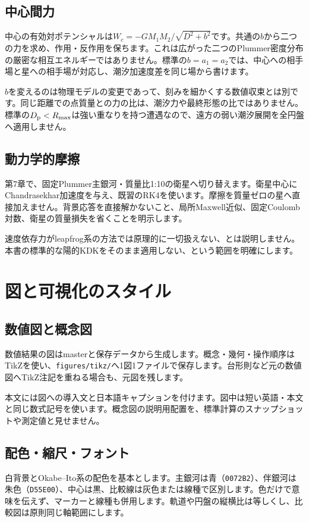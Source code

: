 \documentclass[10pt,openany]{book}
\begin{document}
\subsection{中心間力}
中心の有効対ポテンシャルは$W_c=-GM_1M_2/\sqrt{D^2+b^2}$です。共通の$b$から二つの力を求め、作用・反作用を保ちます。これは広がった二つのPlummer密度分布の厳密な相互エネルギーではありません。標準の$b=a_1=a_2$では、中心への相手場と星への相手場が対応し、潮汐加速度差を同じ場から書けます。

$b$を変えるのは物理モデルの変更であって、刻みを細かくする数値収束とは別です。同じ距離での点質量との力の比は、潮汐力や最終形態の比ではありません。標準の$D_{\rm p}<R_{\max}$は強い重なりを持つ遭遇なので、遠方の弱い潮汐展開を全円盤へ適用しません。
\subsection{動力学的摩擦}
第7章で、固定Plummer主銀河・質量比1:10の衛星へ切り替えます。衛星中心にChandrasekhar加速度を与え、既習のRK4を使います。摩擦を質量ゼロの星へ直接加えません。背景応答を直接解かないこと、局所Maxwell近似、固定Coulomb対数、衛星の質量損失を省くことを明示します。

速度依存力がleapfrog系の方法では原理的に一切扱えない、とは説明しません。本書の標準的な陽的KDKをそのまま適用しない、という範囲を明確にします。


\section{図と可視化のスタイル}
\subsection{数値図と概念図}
数値結果の図はmasterと保存データから生成します。概念・幾何・操作順序はTikZを使い、\texttt{figures/tikz/}へ1図1ファイルで保存します。台形則など元の数値図へTikZ注記を重ねる場合も、元図を残します。

本文には図への導入文と日本語キャプションを付けます。図中は短い英語・本文と同じ数式記号を使います。概念図の説明用配置を、標準計算のスナップショットや測定値と見せません。
\subsection{配色・縮尺・フォント}
白背景とOkabe--Ito系の配色を基本とします。主銀河は青（\texttt{0072B2}）、伴銀河は朱色（\texttt{D55E00}）、中心は黒、比較線は灰色または線種で区別します。色だけで意味を伝えず、マーカーと線種も併用します。軌道や円盤の縦横比は等しくし、比較図は原則同じ軸範囲にします。
\end{document}
